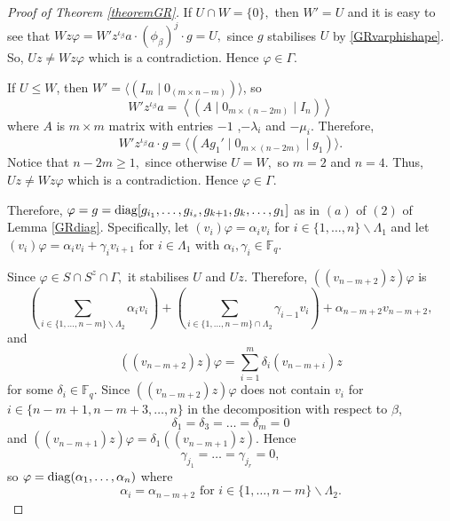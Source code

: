 \begin{proof}[Proof of Theorem {\rm \ref{theoremGR}}]
 If $U \cap W=\{0\},$ then $W'=U$ and it is easy to see that $Wz \varphi = W'z^{\iota_{\beta}}a\cdot (\phi_{\beta})^j \cdot g= U,$ since $g$ stabilises $U$ by \eqref{GRvarphishape}. So, $Uz \ne Wz \varphi$ which is a contradiction. Hence $\varphi \in \Gamma.$

If $U \le W$, then $W'= \langle (I_m  \mid  0_{(m \times n-m)}) \rangle$, so 
$$W'z^{\iota_{\beta}}a= \left \langle 
(A \mid 0_{m \times (n-2m)} \mid I_n)
\right \rangle$$
where $A$ is $m \times m$ matrix with entries $-1$ ,$-\lambda_i$ and $- \mu_i$.
Therefore, $$W'z^{\iota_{\beta}}a \cdot g = \langle (A g_1'\mid 0_{m \times (n-2m)}\mid g_1) \rangle.$$ Notice that $n-2m\ge 1,$ since otherwise  $U = W,$ so $m=2$ and $n=4.$ Thus, $Uz \ne Wz \varphi$ which is a contradiction. Hence $\varphi \in \Gamma.$

Therefore, $\varphi = g= \mathrm{diag}[g_{i_1}, \ldots,g_{i_s}, g_{k+1}, g_k, \ldots,  g_1]$ as in $(a)$ of $(2)$ of Lemma
\ref{GRdiag}. Specifically, let $(v_i)\varphi =\alpha_i v_i$ for $i \in \{1, \ldots, n\} \backslash \Lambda_1$ and let $(v_i)\varphi = \alpha_i v_i + \gamma_i v_{i+1}$ for $i \in \Lambda_1$ with $\alpha_i, \gamma_i \in \mathbb{F}_q.$

 Since $\varphi \in S \cap S^z \cap \Gamma,$ it stabilises $U$ and $Uz.$  
Therefore, $((v_{n-m+2})z) \varphi$ is
\begin{equation*}
\label{vnm2zph}
\left(\underset{i \in \{1, \ldots, n-m\} \backslash \Lambda_2}{\sum} \alpha_i v_i \right) +
\left(\underset{i \in \{1, \ldots, n-m\} \cap \Lambda_2}{\sum} \gamma_{i-1} v_i \right) + \alpha_{n-m+2} v_{n-m+2},
\end{equation*}
and
$$((v_{n-m+2})z) \varphi= \sum_{i=1}^m \delta_i (v_{n-m+i})z$$
for some $\delta_i \in \mathbb{F}_q.$ Since $((v_{n-m+2})z) \varphi$ does not contain $v_i$ for $i \in \{n-m+1,n-m+3, \ldots, n\}$ in the decomposition with respect to $\beta$, 
$$\delta_1= \delta_3 = \ldots = \delta_m =0$$
and $((v_{n-m+1})z) \varphi= \delta_1 ((v_{n-m+1})z).$ Hence 
$$\gamma_{j_1} = \ldots = \gamma_{j_r}=0,$$
so $\varphi= \mathrm{diag}(\alpha_1, \ldots, \alpha_n)$ where 
\begin{equation}
\label{GRalphasvnm2}
\alpha_i=\alpha_{n-m+2} \text{ for } i \in \{1, \ldots, n-m\} \backslash \Lambda_2.
\end{equation} 


\end{proof}
